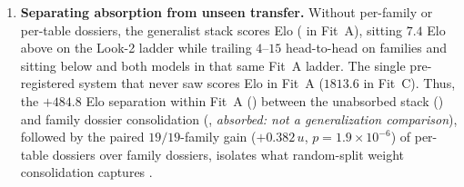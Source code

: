 \begin{enumerate}
  \item \textbf{Separating absorption from unseen transfer.} Without per-family or per-table dossiers, the generalist stack scores \BHEloInCorpus{} Elo (\regincorpus{} in Fit~A), sitting $7.4$ Elo above  on the Look-2 ladder while trailing  $4$--$15$ head-to-head on families and sitting below  and both  models in that same Fit~A ladder. The single pre-registered system that never saw  scores \BHEloFairReg{} Elo in Fit~A ($1813.6$ in Fit~C). Thus, the $+484.8$ Elo separation within Fit~A () between the unabsorbed stack (\BHEloInCorpus{}) and family dossier consolidation (\BHEloRecall{}, \emph{absorbed: not a generalization comparison}), followed by the paired $19/19$-family gain ($+0.382\,u$, $p = 1.9\times 10^{-6}$) of per-table dossiers over family dossiers, isolates what random-split weight consolidation captures \est{}.
\end{enumerate}
